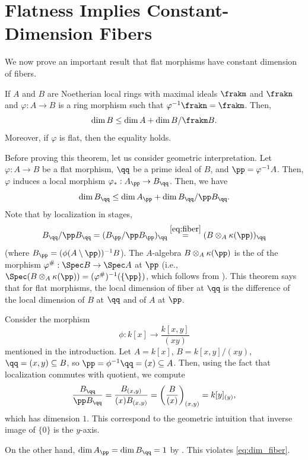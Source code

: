 \section{Flatness Implies Constant-Dimension Fibers}
\label{sec:flat_const_dim}
We now prove an important result that flat morphisms
have constant dimension of fibers.
\begin{theorem}
    \label{thm:flat_dim_fiber}
    If $A$ and $B$ are Noetherian local rings with maximal ideals
    $\frakm$ and $\frakn$ and $\varphi : A\to B$
    is a ring morphism such that $\varphi^{-1}\frakn = \frakm$.
    Then,
    $$\dim B \leq \dim A + \dim B/\frakm B.$$
    Moreover, if $\varphi$ is flat, then the equality holds.
\end{theorem}
Before proving this theorem, let us consider geometric interpretation.
Let $\varphi : A\to B$ be a flat morphism,
$\qq$ be a prime ideal of $B$, and $\pp = \varphi^{-1}A$.
Then, $\varphi$ induces a local morphism
$\varphi_* : A_\pp \to B_\qq$. Then, we have
\begin{equation}
\label{eq:dim_fiber}
\dim B_\qq \leq \dim A_\pp + \dim B_\qq / \pp B_\qq.
\end{equation}
Note that by localization in stages,
$$B_\qq / \pp B_\qq = (B_\pp / \pp B_\pp)_\qq 
\stackrel{\eqref{eq:fiber}}= (B \otimes_A \kappa(\pp))_\qq$$
(where $B_\pp = (\phi(A\setminus\pp))^{-1}B$).
The $A$-algebra $B\otimes_A \kappa(\pp)$ is the  
of the morphism $\varphi^{\#} : \Spec B\to \Spec A$ 
at $\pp$ (i.e., $\Spec(B\otimes_A \kappa(\pp)) = 
(\varphi^\#)^{-1}(\{\pp\})$, which follows from 
). 
This theorem says that for flat morphisms,
the local dimension of fiber at $\qq$
is the difference of the local dimension of $B$ at $\qq$
and of $A$ at $\pp$.
\begin{example}
    Consider the morphism
    $$\phi : k[x] \to \frac{k[x,y]}{(xy)}$$
    mentioned in the introduction. Let $A=k[x]$,
    $B=k[x,y]/(xy)$, $\qq = (x,y)\subseteq B$,
    so $\pp  = \phi^{-1}\qq = (x) \subseteq A$.
    Then, using the fact that localization commutes
    with quotient, we compute
    $$\frac{B_\qq}{\pp B_\qq} 
    = \frac{B_{(x,y)}}{(x)B_{(x,y)}}
    = \left(\frac{B}{(x)}\right)_{(x,y)}
    = k[y]_{(y)},$$
    which has dimension $1$. 
    This correspond to the geometric intuition
    that inverse image of $\{0\}$ is the $y$-axis.
    
    On the other hand, $\dim A_\pp = \dim B_\qq = 1$
    by .
    This violates \eqref{eq:dim_fiber}.
\end{example}
